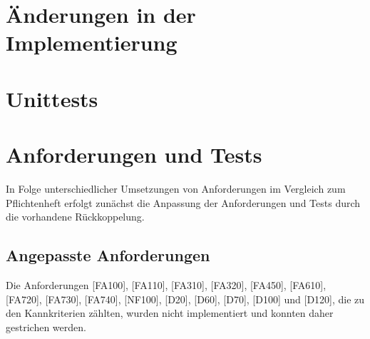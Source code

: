 \documentclass[parskip=full]{scrartcl}
\begin{document}
\section{Änderungen in der Implementierung}

\section{Unittests}

\section{Anforderungen und Tests}
In Folge unterschiedlicher Umsetzungen von Anforderungen im Vergleich zum Pflichtenheft erfolgt zunächst die Anpassung der Anforderungen und Tests durch die vorhandene Rückkoppelung.

\subsection{Angepasste Anforderungen}
Die Anforderungen [FA100], [FA110], [FA310], [FA320], [FA450], [FA610], [FA720], [FA730], [FA740], [NF100], [D20], [D60], [D70], [D100] und [D120], die zu den Kannkriterien zählten, wurden nicht implementiert und konnten daher gestrichen werden.
\end{document}
